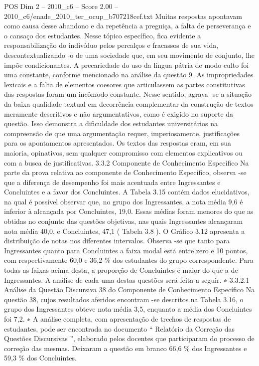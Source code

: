 \begin{textsample}{POS Dim 2 – 2010\_c6 – Score 2.00 – 2010\_c6/enade\_2010\_ter\_ocup\_b707218cef.txt}
Muitas respostas apontavam como causa desse abandono e da repetência a preguiça, a falta de perseverança e o cansaço dos estudantes.
Nesse tópico específico, fica evidente a responsabilização do indivíduo pelos percalços e fracassos de sua vida, descontextualizando -o de uma sociedade que, em seu movimento de conjunto, lhe impõe condicionantes.
A precariedade do uso da língua pátria de modo culto foi uma constante, conforme mencionado na análise da questão 9.
As impropriedades lexicais e a falta de elementos coesores que articulassem as partes constitutivas das respostas foram um incômodo constante.
Nesse sentido, agrava -se a situação da baixa qualidade textual em decorrência complementar da construção de textos meramente descritivos e não argumentativos, como é exigido no suporte da questão.
Isso demonstra a dificuldade dos estudantes universitários na compreensão de que uma argumentação requer, imperiosamente, justificações para os apontamentos apresentados.
Os textos das respostas eram, em sua maioria, opinativos, sem qualquer compromisso com elementos explicativos ou com a busca de justificativas. 3.3.2 Componente de Conhecimento Específico Na parte da prova relativa ao componente de Conhecimento Específico, observa -se que a diferença de desempenho foi mais acentuada entre Ingressantes e Concluintes e a favor dos Concluintes.
A Tabela 3.15 contém dados elucidativos, na qual é possível observar que, no grupo dos Ingressantes, a nota média 9,6 é inferior à alcançada por Concluintes, 19,0.
Essas médias foram menores do que as obtidas no conjunto das questões objetivas, nas quais Ingressantes alcançaram nota média 40,0, e Concluintes, 47,1 ( Tabela 3.8 ).
O Gráfico 3.12 apresenta a distribuição de notas nos diferentes intervalos.
Observa -se que tanto para Ingressantes quanto para Concluintes a faixa modal está entre zero e 10 pontos, com respectivamente 60,0 e 36,2 \% dos estudantes do grupo correspondente.
Para todas as faixas acima desta, a proporção de Concluintes é maior do que a de Ingressantes.
A análise de cada uma destas questões será feita a seguir. ∗ 3.3.2.1 Análise da Questão Discursiva 38 do Componente de Conhecimento Específico Na questão 38, cujos resultados aferidos encontram -se descritos na Tabela 3.16, o grupo dos Ingressantes obteve nota média 3,5, enquanto a média dos Concluintes foi 7,2. ∗ A análise completa, com apresentação de trechos de respostas de estudantes, pode ser encontrada no documento “ Relatório da Correção das Questões Discursivas ”, elaborado pelos docentes que participaram do processo de correção das mesmas.
Deixaram a questão em branco 66,6 \% dos Ingressantes e 59,3 \% dos Concluintes.

\end{textsample}
